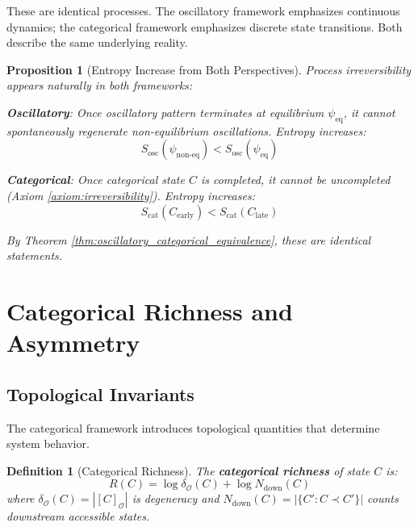 \documentclass[11pt]{article}
\newtheorem{definition}[theorem]{Definition}
\newtheorem{proposition}[theorem]{Proposition}
\theoremstyle{remark}
\begin{document}
These are identical processes. The oscillatory framework emphasizes continuous dynamics; the categorical framework emphasizes discrete state transitions. Both describe the same underlying reality.

\begin{proposition}[Entropy Increase from Both Perspectives]
\label{prop:entropy_increase_unified}
Process irreversibility appears naturally in both frameworks:

\textbf{Oscillatory}: Once oscillatory pattern terminates at equilibrium $\psi_{\text{eq}}$, it cannot spontaneously regenerate non-equilibrium oscillations. Entropy increases:
\begin{equation}
S_{\text{osc}}(\psi_{\text{non-eq}}) < S_{\text{osc}}(\psi_{\text{eq}})
\end{equation}

\textbf{Categorical}: Once categorical state $C$ is completed, it cannot be uncompleted (Axiom \ref{axiom:irreversibility}). Entropy increases:
\begin{equation}
S_{\text{cat}}(C_{\text{early}}) < S_{\text{cat}}(C_{\text{late}})
\end{equation}

By Theorem \ref{thm:oscillatory_categorical_equivalence}, these are identical statements.
\end{proposition}

\section{Categorical Richness and Asymmetry}

\subsection{Topological Invariants}

The categorical framework introduces topological quantities that determine system behavior.

\begin{definition}[Categorical Richness]
\label{def:richness}
The \textbf{categorical richness} of state $C$ is:
\begin{equation}
R(C) = \log \delta_{\mathcal{O}}(C) + \log N_{\text{down}}(C)
\end{equation}
where $\delta_{\mathcal{O}}(C) = |[C]_{\mathcal{O}}|$ is degeneracy and $N_{\text{down}}(C) = |\{C' : C \prec C'\}|$ counts downstream accessible states.
\end{definition}
\end{document}
